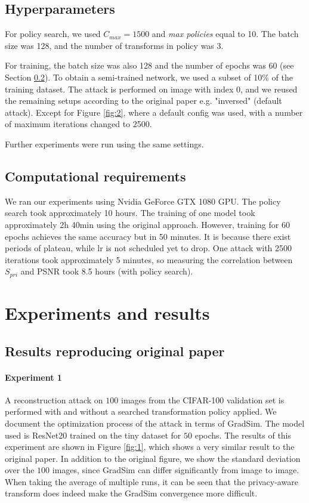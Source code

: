 \subsection{Hyperparameters}

For policy search, we used $C_{max} = 1500$ and \emph{max policies} equal to 10. The batch size was 128, and the number of transforms in policy was 3.

For training, the batch size was also 128 and the number of epochs was 60 (see Section \ref{section:computational-requirements}). To obtain a semi-trained network, we used a subset of 10\% of the training dataset. The attack is performed on image with index $0$, and we reused the remaining setups according to the original paper e.g. "inversed" (default attack). Except for Figure \ref{fig:2}, where a default config was used, with a number of maximum iterations changed to 2500.

Further experiments were run using the same settings.

\subsection{Computational requirements}
\label{section:computational-requirements}
We ran our experiments using Nvidia GeForce GTX 1080 GPU. The policy search took approximately 10 hours. The training of one model took approximately 2h 40min using the original approach. However, training for 60 epochs achieves the same accuracy but in 50 minutes. It is because there exist periods of plateau, while lr is not scheduled yet to drop. One attack with 2500 iterations took approximately 5 minutes, so measuring the correlation between $S_{pri}$ and PSNR took 8.5 hours (with policy search).



\section{Experiments and results}
\label{sec:results}

\subsection{Results reproducing original paper}

\paragraph{Experiment 1} A reconstruction attack on $100$ images from the CIFAR-100 validation set is performed with and without a searched transformation policy applied. We document the optimization process of the attack in terms of GradSim. The model used is ResNet20  trained on the tiny dataset for $50$ epochs. The results of this experiment are shown in Figure \ref{fig:1}, which shows a very similar result to the original paper. In addition to the original figure, we show the standard deviation over the $100$ images, since GradSim can differ significantly from image to image. When taking the average of multiple runs, it can be seen that the privacy-aware transform does indeed make the GradSim convergence more difficult.

